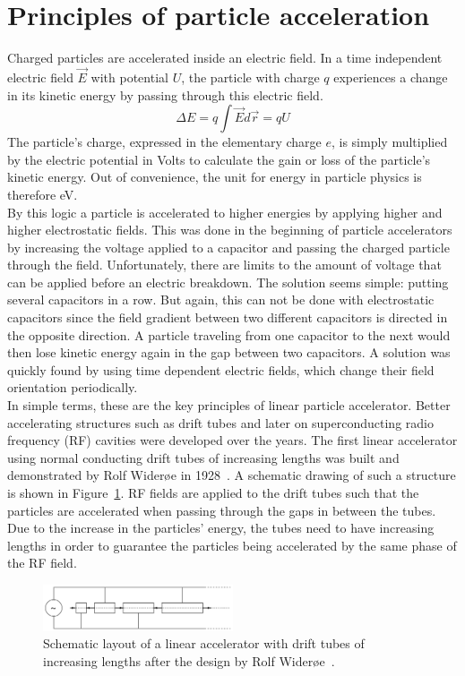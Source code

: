 \section{Principles of particle acceleration}
\label{AccPhysics:Principles}
Charged particles are accelerated inside an electric field. 
In a time independent electric field $\vec{E}$ with potential $U$, the particle with charge $q$ experiences a change in its kinetic energy by passing through this electric field.
\begin{equation}
 \Delta E = q \int \vec{E}d\vec{r} = qU
\end{equation}
The particle's charge, expressed in the elementary charge $e$, is simply multiplied by the electric potential in Volts to calculate the gain or loss of the particle's kinetic energy. 
Out of convenience, the unit for energy in particle physics is therefore eV.\\
By this logic a particle is accelerated to higher energies by applying higher and higher electrostatic fields. 
This was done in the beginning of particle accelerators by increasing the voltage applied to a capacitor and passing the charged particle through the field. 
Unfortunately, there are limits to the amount of voltage that can be applied before an electric breakdown.
The solution seems simple: putting several capacitors in a row.
But again, this can not be done with electrostatic capacitors since the field gradient between two different capacitors is directed in the opposite direction.
A particle traveling from one capacitor to the next would then lose kinetic energy again in the gap between two capacitors.
A solution was quickly found by using time dependent electric fields, which change their field  orientation periodically.\\
In simple terms, these are the key principles of linear particle accelerator.
Better accelerating structures such as drift tubes and later on superconducting radio frequency (RF) cavities were developed over the years.
The first linear accelerator using normal conducting drift tubes of increasing lengths was built and demonstrated by Rolf Wider\o e in 1928~\cite[p. 6]{Wilson}.
A schematic drawing of such a structure is shown in Figure~\ref{fig:Wideroe_Linac}.
RF fields are applied to the drift tubes such that the particles are accelerated when passing through the gaps in between the tubes.
Due to the increase in the particles' energy, the tubes need to have increasing lengths in order to guarantee the particles being accelerated by the same phase of the RF field.
\begin{figure}
\centering
\includegraphics[width=0.5\textwidth]{Figures/Wideroe_Linac.png}
\caption[Schematic layout of a Wider\o e linac]{Schematic layout of a linear accelerator with drift tubes of increasing lengths after the design by Rolf Wider\o e~\cite[p. 40]{Hinterberger}.}
\label{fig:Wideroe_Linac}
\end{figure}
